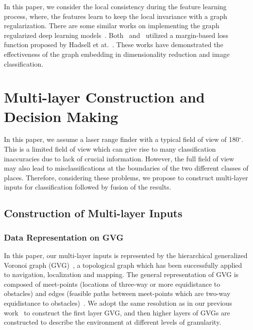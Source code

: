 \documentclass[letterpaper, 10 pt, conference]{ieeeconf}  %
\begin{document}
In this paper, we consider the local consistency during the feature learning process, where, the features learn to keep the local invariance with a graph regularization. There are some similar works on implementing the graph regularized deep learning models~\cite{Hadsell:2006:DRL:1153171.1153654,weston2012deep}. Both~\cite{Hadsell:2006:DRL:1153171.1153654} and~\cite{weston2012deep} utilized a margin-based loss function proposed by Hadsell et at.~\cite{hadsell2006dimensionality}. These works have demonstrated the effectiveness of the graph embedding in dimensionality reduction and image classification.



\section{Multi-layer Construction and Decision Making} \label{secMultilayer}

In this paper, we assume a laser range finder with a typical field of view of 180$^\circ$. This is a limited field of view which can give rise to many classification inaccuracies due to lack of crucial information. However, the full field of view may also lead to misclassifications at the boundaries of the two different classes of places.  Therefore, considering these problems, we propose to construct multi-layer inputs for classification followed by fusion of the results.


\subsection{Construction of Multi-layer Inputs}


\subsubsection{Data Representation on GVG}
In this paper, our multi-layer inputs is represented by the hierarchical generalized Voronoi graph (GVG)~\cite{choset1995sensor}, a topological graph which has been successfully applied to navigation, localization and mapping. The general representation of GVG is composed of meet-points (locations of three-way or more equidistance to obstacles) and edges (feasible paths between meet-points which are two-way equidistance to obstacles)~\cite{tao2011incremental}. We adopt the same resolution as in our previous work~\cite{shi2013towards} to construct the first layer GVG, and then higher layers of GVGs are constructed to describe the environment at different levels of granularity.
\end{document}
